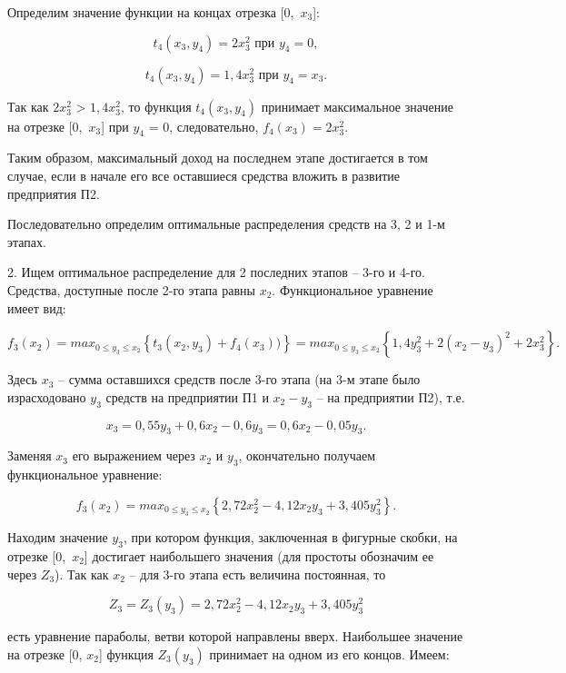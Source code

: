 \documentclass[12pt]{article}
\begin{document}
Определим значение функции на концах отрезка [0,~$ x_{3} $]:

$$ t_4 ( x_3, y_4 ) = 2 x_{3}^{2} \textrm{ при } y_{4} = 0,$$

$$ t_4 ( x_3, y_4 ) = 1{,}4 x_{3}^{2} \textrm{ при } y_{4} = x_{3}.$$

Так как $ 2 x_{3}^{2} $ > $ 1{,}4 x_{3}^{2} $, то функция $ t_4 ( x_3, y_4 ) $ принимает максимальное значение на отрезке [0,~$ x_{3} $] при $ y_{4} $ = 0, следовательно, $ f_4(x_{3}) = 2 x_{3}^{2} $.

Таким образом, максимальный доход на последнем этапе достигается в том случае, если в начале его все оставшиеся средства вложить в развитие предприятия П2.

Последовательно определим оптимальные распределения средств на 3, 2 и 1-м этапах.

2. Ищем оптимальное распределение для 2 последних этапов – 3-го и 4-го. Средства, доступные после 2-го этапа равны $ x_{2} $. Функциональное уравнение имеет вид:

$$ f_3 ( x_{2} ) = max_{ 0 \le y_3 \le x_{2} }{\left\{ t_3 ( x_{2}, y_3 ) + f_4 ( x_3 ) )\right\}}= max_{ 0 \le y_3 \le x_{2} }{\left\{ 1{,}4 y_{3}^{2} + 2 \left(x_{2} - y_{3}\right)^{2} + 2 x_{3}^{2} \right\}}.$$

Здесь $ x_3 $ – сумма оставшихся средств после 3-го этапа (на 3-м этапе было израсходовано $ y_{3} $ средств на предприятии П1 и $ x_{2} - y_{3} $ – на предприятии П2), т.е.

$$ x_3 = 0{,}55 y_{3} + 0{,}6 x_{2} - 0{,}6 y_{3} = 0{,}6 x_{2} - 0{,}05 y_{3} .$$

Заменяя $ x_3 $ его выражением через $ x_{2} $ и $ y_{3} $, окончательно получаем функциональное уравнение:

$$ f_3 ( x_{2} ) = max_{ 0 \le y_3 \le x_{2} }{\left\{ 2{,}72 x_{2}^{2} - 4{,}12 x_{2} y_{3} + 3{,}405 y_{3}^{2} \right\}}.$$

Находим значение $ y_{3} $, при котором функция, заключенная в фигурные скобки, на отрезке [0,~$ x_{2} $] достигает наибольшего значения (для простоты обозначим ее через $ Z_3 $). Так как $ x_{2} $ – для 3-го этапа есть величина постоянная, то

$$ Z_3 = Z_3 ( y_3 ) =  2{,}72 x_{2}^{2} - 4{,}12 x_{2} y_{3} + 3{,}405 y_{3}^{2} $$

есть уравнение параболы, ветви которой направлены вверх. Наибольшее значение на отрезке [0, $ x_{2} $] функция $ Z_3 ( y_3 ) $ принимает на одном из его концов. Имеем:
\end{document}
